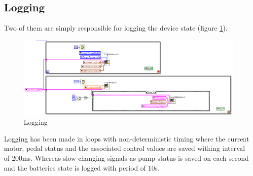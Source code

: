 \subsection{Logging}
Two of them are simply responsible for logging the device state (figure \ref{logging}).
\begin{figure}[H]
    \centering
    \includegraphics[width=\textwidth]{figures/Drive_log.png}
    \caption{Logging}
    \label{logging}
\end{figure}
Logging has been made in loops with non-deterministic timing where the current motor, pedal status and the associated control values are saved withing interval of 200ms.
Whereas slow changing signals as pump status is saved on each second and the batteries state is logged with period of 10s.

